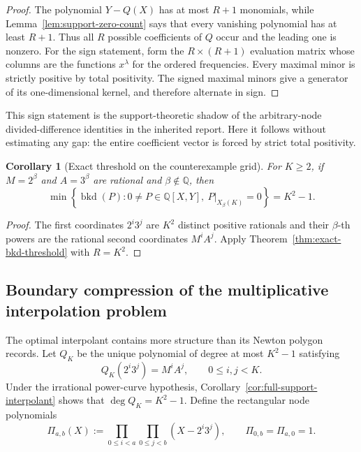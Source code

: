 \documentclass[11pt,oneside]{article}
\newtheorem{corollary}[theorem]{Corollary}
\theoremstyle{definition}
\theoremstyle{remark}
\newcommand{\Q}{\mathbb Q}
\begin{document}
\begin{proof}
The polynomial $Y-Q(X)$ has at most $R+1$ monomials, while
Lemma~\ref{lem:support-zero-count} says that every vanishing polynomial has at least $R+1$.
Thus all $R$ possible coefficients of $Q$ occur and the leading one is nonzero.  For the sign
statement, form the $R\times(R+1)$ evaluation matrix whose columns are the functions
$x^\lambda$ for the ordered frequencies.  Every maximal minor is strictly positive by total
positivity.  The signed maximal minors give a generator of its one-dimensional kernel, and
therefore alternate in sign.
\end{proof}

This sign statement is the support-theoretic shadow of the arbitrary-node divided-difference
identities in the inherited report.  Here it follows without estimating any gap: the entire
coefficient vector is forced by strict total positivity.

\begin{corollary}[Exact threshold on the counterexample grid]
\label{cor:grid-bkd-threshold}
For $K\ge2$, if $M=2^\beta$ and $A=3^\beta$ are rational and $\beta\notin\Q$, then
\begin{equation}
 \min\left\{
  \operatorname{bkd}(P):
  0\ne P\in\Q[X,Y],\ P|_{X_\beta(K)}=0
 \right\}=K^2-1.
 \label{eq:mc-grid-threshold}
\end{equation}
\end{corollary}

\begin{proof}
The first coordinates $2^i3^j$ are $K^2$ distinct positive rationals and their
$\beta$-th powers are the rational second coordinates $M^iA^j$.  Apply
Theorem~\ref{thm:exact-bkd-threshold} with $R=K^2$.
\end{proof}


\subsection{Boundary compression of the multiplicative interpolation problem}
\label{subsec:boundary-compression}

The optimal interpolant contains more structure than its Newton polygon records.  Let $Q_K$ be
the unique polynomial of degree at most $K^2-1$ satisfying
\begin{equation}
 Q_K(2^i3^j)=M^iA^j,
 \qquad 0\le i,j<K.
 \label{eq:boundary-Q}
\end{equation}
Under the irrational power-curve hypothesis, Corollary~\ref{cor:full-support-interpolant}
shows that $\deg Q_K=K^2-1$.  Define the rectangular node polynomials
\begin{equation}
 \Pi_{a,b}(X):=
 \prod_{0\le i<a}\prod_{0\le j<b}(X-2^i3^j),
 \qquad \Pi_{0,b}=\Pi_{a,0}=1.
 \label{eq:boundary-Pi}
\end{equation}
\end{document}
